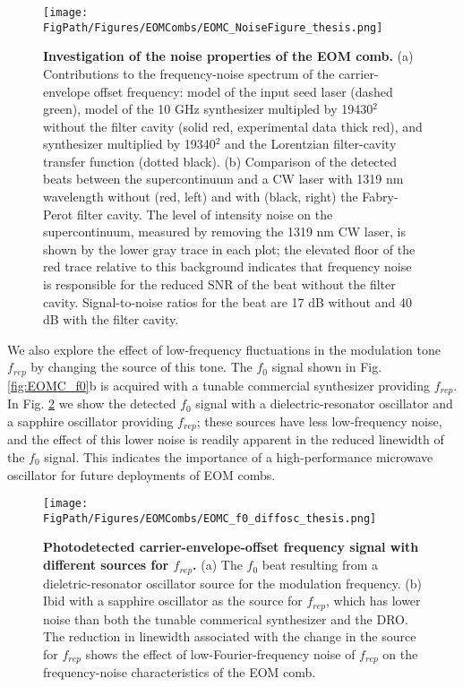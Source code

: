 \begin{figure}[htpb]
	\begin{center}
		\texttt{[image: \\FigPath/Figures/EOMCombs/EOMC\_NoiseFigure\_thesis.png]}
	\end{center}
	\caption[Figure Title]{\textbf{Investigation of the noise properties of the EOM comb.}  (a) Contributions to the frequency-noise spectrum of the carrier-envelope offset frequency: model of the input seed laser (dashed green), model of the 10 GHz synthesizer multipled by 19430$^2$ without the filter cavity (solid red, experimental data thick red), and synthesizer multiplied by 19340$^2$ and the Lorentzian filter-cavity transfer function (dotted black). (b) Comparison of the detected beats between the supercontinuum and a CW laser with 1319 nm wavelength without (red, left) and with (black, right) the Fabry-Perot filter cavity. The level of intensity noise on the supercontinuum, measured by removing the 1319 nm CW laser, is shown by the lower gray trace in each plot; the elevated floor of the red trace relative to this background indicates that frequency noise is responsible for the reduced SNR of the beat without the filter cavity. Signal-to-noise ratios for the beat are 17 dB without and 40 dB with the filter cavity.}
	\label{fig:EOMC_noise}
\end{figure} 

We also explore the effect of low-frequency fluctuations in the modulation tone $f_{rep}$ by changing the source of this tone. The $f_0$ signal shown in Fig. \ref{fig:EOMC_f0}b is acquired with a tunable commercial synthesizer providing $f_{rep}$. In Fig. \ref{fig:EOMC_f0_sources} we show the detected $f_0$ signal with a dielectric-resonator oscillator and a sapphire oscillator providing $f_{rep}$; these sources have less low-frequency noise, and the effect of this lower noise is readily apparent in the reduced linewidth of the $f_0$ signal. This indicates the importance of a high-performance microwave oscillator for future deployments of EOM combs.



\begin{figure}[htpb]
	\begin{center}
		\texttt{[image: \\FigPath/Figures/EOMCombs/EOMC\_f0\_diffosc\_thesis.png]}
	\end{center}
	\caption[Figure Title]{\textbf{Photodetected carrier-envelope-offset frequency signal with different sources for $f_{rep}$.} (a) The $f_0$ beat resulting from a dieletric-resonator oscillator source for the modulation frequency. (b) Ibid with a sapphire oscillator as the source for $f_{rep}$, which has lower noise than both the tunable commerical synthesizer and the DRO. The reduction in linewidth associated with the change in the source for $f_{rep}$ shows the effect of low-Fourier-frequency noise of $f_{rep}$ on the frequency-noise characteristics of the EOM comb. }
	\label{fig:EOMC_f0_sources}
\end{figure} 

